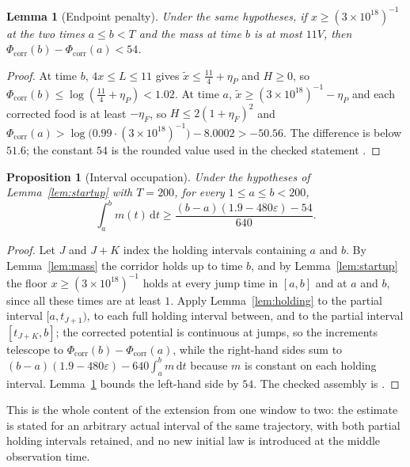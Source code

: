 \documentclass[11pt,letterpaper]{article}
\theoremstyle{plain}
\newtheorem{proposition}[theorem]{Proposition}
\newtheorem{lemma}[theorem]{Lemma}
\theoremstyle{definition}
\theoremstyle{remark}
\numberwithin{equation}{section}
\newcommand{\eps}{\varepsilon}
\newcommand{\dd}{\,\mathrm d}
\newcommand{\floorstock}{(3\times10^{18})^{-1}}
\newcommand{\corr}{\mathrm{corr}}
\begin{document}
\begin{lemma}[Endpoint penalty]\label{lem:endpoint}
Under the same hypotheses, if $x\ge\floorstock$ at the two times $a\le b<T$ and the mass at time $b$ is at most $11V$, then $\Phi_\corr(b)-\Phi_\corr(a)<54$.
\end{lemma}
\begin{proof}
At time $b$, $4x\le L\le11$ gives $\tilde x\le\tfrac{11}4+\eta_P$ and $H\ge0$, so $\Phi_\corr(b)\le\log(\tfrac{11}4+\eta_P)<1.02$. At time $a$, $\tilde x\ge\floorstock-\eta_P$ and each corrected food is at least $-\eta_F$, so $H\le2(1+\eta_F)^2$ and $\Phi_\corr(a)>\log\bigl(0.99\cdot\floorstock\bigr)-8.0002>-50.56$. The difference is below $51.6$; the constant $54$ is the rounded value used in the checked statement .
\end{proof}

\begin{proposition}[Interval occupation]\label{prop:interval}
Under the hypotheses of Lemma~\ref{lem:startup} with $T=200$, for every $1\le a\le b<200$,
\begin{equation}\label{eq:interval}
 \int_a^bm(t)\dd t\ge\frac{(b-a)(1.9-480\eps)-54}{640}.
\end{equation}
\end{proposition}
\begin{proof}
Let $J$ and $J+K$ index the holding intervals containing $a$ and $b$. By Lemma~\ref{lem:mass} the corridor holds up to time $b$, and by Lemma~\ref{lem:startup} the floor $x\ge\floorstock$ holds at every jump time in $[a,b]$ and at $a$ and $b$, since all these times are at least $1$. Apply Lemma~\ref{lem:holding} to the partial interval $[a,t_{J+1})$, to each full holding interval between, and to the partial interval $[t_{J+K},b]$; the corrected potential is continuous at jumps, so the increments telescope to $\Phi_\corr(b)-\Phi_\corr(a)$, while the right-hand sides sum to $(b-a)(1.9-480\eps)-640\int_a^bm\dd t$ because $m$ is constant on each holding interval. Lemma~\ref{lem:endpoint} bounds the left-hand side by $54$. The checked assembly is .
\end{proof}

This is the whole content of the extension from one window to two: the estimate is stated for an arbitrary actual interval of the same trajectory, with both partial holding intervals retained, and no new initial law is introduced at the middle observation time.
\end{document}
